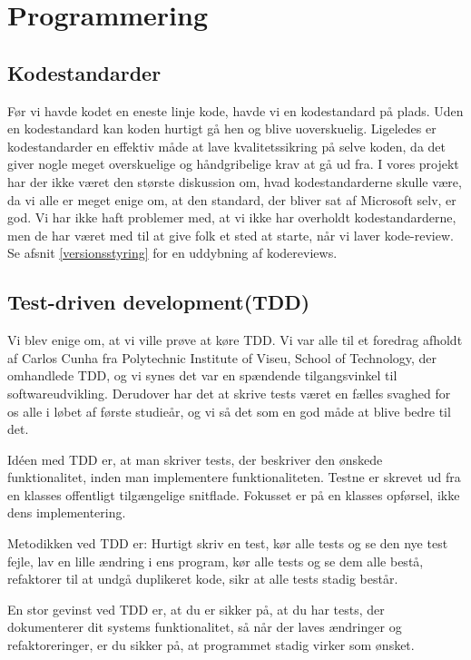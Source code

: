 \section{Programmering}
\label{kabitel:Programmering}
\subsection{Kodestandarder}
\label{Kodestandarder}

Før vi havde kodet en eneste linje kode, havde vi en kodestandard på plads.
Uden en kodestandard kan koden hurtigt gå hen og blive uoverskuelig.
Ligeledes er kodestandarder en effektiv måde at lave kvalitetssikring på selve koden, da det giver nogle meget overskuelige og håndgribelige krav at gå ud fra.
I vores projekt har der ikke været den største diskussion om, hvad kodestandarderne skulle være, da vi alle er meget enige om, at den standard, der bliver sat af Microsoft selv, er god\cite{microsoftcsharp}. 
Vi har ikke haft problemer med, at vi ikke har overholdt kodestandarderne, men de har været med til at give folk et sted at starte, når vi laver kode-review. Se afsnit \ref{versionsstyring} for en uddybning af kodereviews.

\subsection{Test-driven development(TDD)}
\label{TDD}

Vi blev enige om, at vi ville prøve at køre TDD.
Vi var alle til et foredrag afholdt af Carlos Cunha fra Polytechnic Institute of Viseu, School of Technology, der omhandlede TDD, og vi synes det var en spændende tilgangsvinkel til softwareudvikling.
Derudover har det at skrive tests været en fælles svaghed for os alle i løbet af første studieår, og vi så det som en god måde at blive bedre til det.

Idéen med TDD er, at man skriver tests, der beskriver den ønskede funktionalitet, inden man implementere funktionaliteten.
Testne er skrevet ud fra en klasses offentligt tilgængelige snitflade.
Fokusset er på en klasses opførsel, ikke dens implementering.

Metodikken ved TDD er:
Hurtigt skriv en test, kør alle tests og se den nye test fejle, lav en lille ændring i ens program, kør alle tests og se dem alle bestå, refaktorer til at undgå duplikeret kode, sikr at alle tests stadig består.

En stor gevinst ved TDD er, at du er sikker på, at du har tests, der dokumenterer dit systems funktionalitet, så når der laves ændringer og refaktoreringer, er du sikker på, at programmet stadig virker som ønsket.

